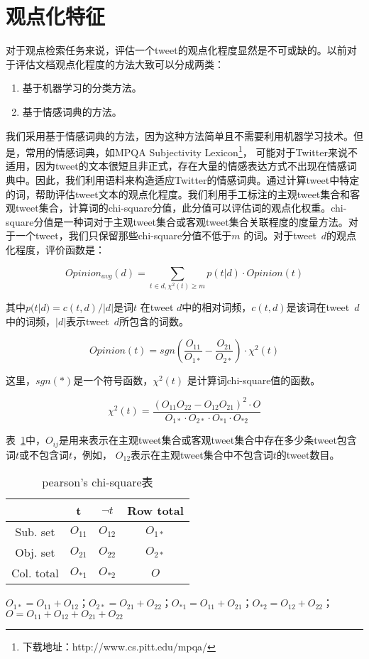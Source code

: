 \section{观点化特征}
\label{form}
对于观点检索任务来说，评估一个tweet的观点化程度显然是不可或缺的。以前对于评估文档观点化程度的方法大致可以分成两类：
  \begin{enumerate}
  \item 基于机器学习的分类方法。
  \item 基于情感词典的方法。
   \end{enumerate}
   我们采用基于情感词典的方法，因为这种方法简单且不需要利用机器学习技术。但是，常用的情感词典，如MPQA Subjectivity Lexicon\footnote{下载地址：http://www.cs.pitt.edu/mpqa/}， 可能对于Twitter来说不适用，因为tweet的文本很短且非正式，存在大量的情感表达方式不出现在情感词典中。因此，我们利用语料来构造适应Twitter的情感词典。通过计算tweet中特定的词，帮助评估tweet文本的观点化程度。我们利用手工标注的主观tweet集合和客观tweet集合，计算词的chi-square分值，此分值可以评估词的观点化权重。chi-square分值是一种词对于主观tweet集合或客观tweet集合关联程度的度量方法。对于一个tweet，我们只保留那些chi-square分值不低于$m$ 的词。对于tweet~$d$的观点化程度，评价函数是：

$$Opinion_{avg}(d)=\sum_{t\in d, \chi^{2}(t)\geq m}p(t|d)\cdot Opinion(t)$$

其中$p(t|d)=c(t,d)/|d|$是词$t$ 在tweet $d$中的相对词频，$c(t,d)$是该词在tweet~$d$中的词频，$|d|$表示tweet~$d$所包含的词数。

$$Opinion(t)=sgn(\frac{O_{11}}{O_{1*}}-\frac{O_{21}}{O_{2*}})\cdot \chi^{2}(t)$$

这里，$sgn(*)$是一个符号函数，$\chi^{2}(t)$ 是计算词chi-square值的函数。

$$\chi^{2}(t)=\frac{(O_{11}O_{22}-O_{12}O_{21})^2\cdot O}{O_{1*}\cdot O_{2*}\cdot O_{*1}\cdot O_{*2}}$$ 

表~\ref{chi-square}中，$O_{ij}$是用来表示在主观tweet集合或客观tweet集合中存在多少条tweet包含词$t$或不包含词$t$，例如， $O_{12}$表示在主观tweet集合中不包含词$t$的tweet数目。

\begin{table}[htp]
\centering
\caption{pearson's chi-square表}
\label{chi-square}
\begin{tabular}{|c|c|c|c|}
\hline
 & t & $\neg{t}$& Row total\\
 \hline
 Sub. set & $O_{11}$ & $O_{12}$& $O_{1*}$\\
 \hline
Obj. set & $O_{21}$ & $O_{22}$& $O_{2*}$\\
 \hline
 Col. total & $O_{*1}$ & $O_{*2}$& $O$\\
 \hline
\end{tabular}
  \begin{tablenotes}
        \footnotesize
\item  $O_{1*}=O_{11}+O_{12}$；$O_{2*}=O_{21}+O_{22}$；$O_{*1}=O_{11}+O_{21}$；$O_{*2}=O_{12}+O_{22}$；$O=O_{11}+O_{12}+O_{21}+O_{22}$
\end{tablenotes}
\end{table}

